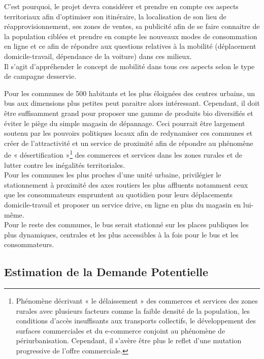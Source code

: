 \documentclass[12pt,a4paper]{report}
\begin{document}
	C’est pourquoi, le projet devra considérer et prendre en compte ces aspects territoriaux afin d’optimiser son itinéraire, la localisation de son lieu de réapprovisionnement, ses zones de ventes, sa publicité afin de se faire connaitre de la population ciblées et prendre en compte les nouveaux modes de consommation en ligne et ce afin de répondre aux  questions relatives à la mobilité (déplacement domicile-travail, dépendance de la voiture) dans ces milieux. \\
	
	Il s’agit d’appréhender le concept de mobilité dans tous ces aspects selon le type de campagne desservie. 
	
	Pour les communes de 500 habitants et les plus éloignées des centres urbains, un bus aux dimensions plus petites peut paraitre alors intéressant. Cependant, il doit être suffisamment grand pour proposer une gamme de produits bio diversifiés et éviter le piège du simple magasin de dépannage. Ceci pourrait être largement soutenu par les pouvoirs politiques locaux afin de redynamiser ces communes et créer de l’attractivité et un service de proximité afin de répondre au phénomène de « désertification »\footnote{Phénomène décrivant « le délaissement » des commerces et services des zones rurales avec plusieurs facteurs comme la faible densité de la population, les conditions d’accès insuffisants aux transports collectifs, le développement des surfaces commerciales et du e-commerce conjoint au phénomène de périurbanisation. Cependant, il s'avère être plus le reflet d’une mutation progressive de l’offre commerciale. } des commerces et services dans les zones rurales et de lutter contre les inégalités territoriales.\\
	
	Pour les communes les plus proches d’une unité urbaine, privilégier le stationnement à proximité des axes routiers les plus affluents notamment ceux que les consommateurs empruntent au quotidien pour leurs déplacements domicile-travail et proposer un service drive, en ligne en plus du magasin en lui-même. \\
	
	Pour le reste des communes, le bus serait stationné sur les places publiques les plus dynamiques, centrales et les plus accessibles à la fois pour le bus et les consommateurs. 
	
		\subsection{Estimation de la Demande Potentielle }
	
\end{document}
